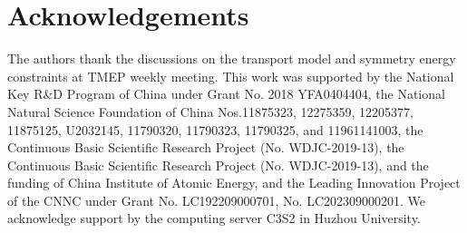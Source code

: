 \documentclass[reprint,aps,prc,twocolumn,superscriptaddress]{revtex4-1}
\begin{document}
\section*{Acknowledgements}
The authors thank the discussions on the transport model and symmetry energy constraints at TMEP weekly meeting. This work was supported by the National Key R\&D Program of China under Grant No. 2018 YFA0404404, the National Natural Science Foundation of China Nos.11875323, 12275359, 12205377, 11875125, U2032145, 11790320, 11790323, 11790325, and 11961141003, the Continuous Basic Scientific Research Project (No. WDJC-2019-13), the Continuous Basic Scientific Research Project (No. WDJC-2019-13), and the funding of China Institute of Atomic Energy, and the Leading Innovation Project of the CNNC under Grant No. LC192209000701, No.  LC202309000201. We acknowledge support by the computing server C3S2 in Huzhou University.

%




\end{document}
